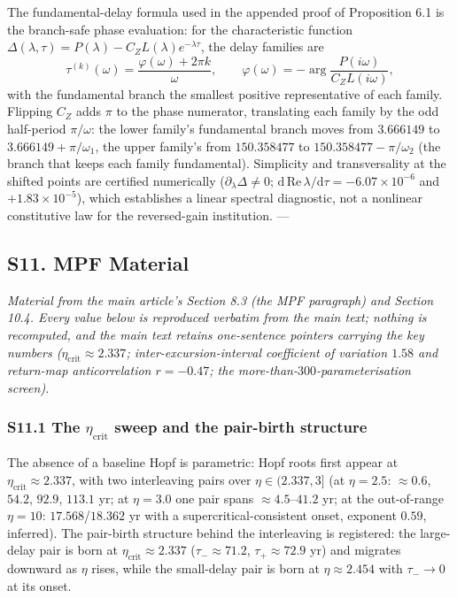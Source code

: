 \documentclass[
  10pt,
  a4paper,
]{article}
\begin{document}
The fundamental-delay formula used in the appended proof of Proposition
6.1 is the branch-safe phase evaluation: for the characteristic function
\(\Delta(\lambda, \tau) = P(\lambda) - C_Z L(\lambda) e^{-\lambda\tau}\),
the delay families are
\[\tau^{(k)}(\omega) = \frac{\varphi(\omega) + 2\pi k}{\omega}, \qquad \varphi(\omega) = -\arg\frac{P(i\omega)}{C_Z L(i\omega)},\]
with the fundamental branch the smallest positive representative of each
family. Flipping \(C_Z\) adds \(\pi\) to the phase numerator,
translating each family by the odd half-period \(\pi/\omega\): the lower
family's fundamental branch moves from \(3.666149\) to
\(3.666149 + \pi/\omega_1\), the upper family's from \(150.358477\) to
\(150.358477 - \pi/\omega_2\) (the branch that keeps each family
fundamental). Simplicity and transversality at the shifted points are
certified numerically (\(\partial_\lambda\Delta \ne 0\);
\(\mathrm{d}\,\mathrm{Re}\,\lambda/\mathrm{d}\tau = -6.07\times10^{-6}\)
and \(+1.83\times10^{-5}\)), which establishes a linear spectral
diagnostic, not a nonlinear constitutive law for the reversed-gain
institution. ---

\subsection{S11. MPF Material}\label{s11.-mpf-material}

\emph{Material from the main article's Section 8.3 (the MPF paragraph)
and Section 10.4. Every value below is reproduced verbatim from the main
text; nothing is recomputed, and the main text retains one-sentence
pointers carrying the key numbers
(\(\eta_{\mathrm{crit}} \approx 2.337\); inter-excursion-interval
coefficient of variation \(1.58\) and return-map anticorrelation
\(r = -0.47\); the more-than-\(300\)-parameterisation screen).}

\subsubsection{\texorpdfstring{S11.1 The \(\eta_{\mathrm{crit}}\) sweep
and the pair-birth
structure}{S11.1 The \textbackslash eta\_\{\textbackslash mathrm\{crit\}\} sweep and the pair-birth structure}}\label{s11.1-the-eta_mathrmcrit-sweep-and-the-pair-birth-structure}

The absence of a baseline Hopf is parametric: Hopf roots first appear at
\(\eta_{\mathrm{crit}} \approx 2.337\), with two interleaving pairs over
\(\eta \in (2.337, 3]\) (at \(\eta = 2.5\): \(\approx0.6\), \(54.2\),
\(92.9\), \(113.1\) yr; at \(\eta = 3.0\) one pair spans
\(\approx4.5\)--\(41.2\) yr; at the out-of-range \(\eta = 10\):
\(17.568\)/\(18.362\) yr with a supercritical-consistent onset, exponent
\(0.59\), inferred). The pair-birth structure behind the interleaving is
registered: the large-delay pair is born at
\(\eta_{\mathrm{crit}} \approx 2.337\) (\(\tau_- \approx 71.2\),
\(\tau_+ \approx 72.9\) yr) and migrates downward as \(\eta\) rises,
while the small-delay pair is born at \(\eta \approx 2.454\) with
\(\tau_- \to 0\) at its onset.
\end{document}
